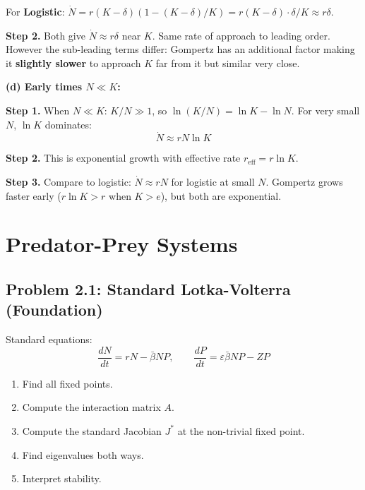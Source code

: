 \documentclass[10pt]{article}
\begin{document}
\begin{solution}
For \textbf{Logistic}: $\dot N = r(K-\delta)(1-(K-\delta)/K) = r(K-\delta)\cdot\delta/K \approx r\delta$.

\textbf{Step 2.} Both give $\dot N \approx r\delta$ near $K$. Same rate of approach to leading order. However the sub-leading terms differ: Gompertz has an additional factor making it \textbf{slightly slower} to approach $K$ far from it but similar very close.

\medskip\textbf{(d) Early times $N \ll K$:}

\textbf{Step 1.} When $N \ll K$: $K/N \gg 1$, so $\ln(K/N) = \ln K - \ln N$. For very small $N$, $\ln K$ dominates:
\[
\dot N \approx rN\ln K
\]

\textbf{Step 2.} This is exponential growth with effective rate $r_{\text{eff}} = r\ln K$.

\textbf{Step 3.} Compare to logistic: $\dot N \approx rN$ for logistic at small $N$. Gompertz grows faster early ($r\ln K > r$ when $K > e$), but both are exponential.
\end{solution}

\newpage
\section{Predator-Prey Systems}

\subsection{Problem 2.1: Standard Lotka-Volterra (Foundation)}

\begin{problem}
Standard equations:
\[
\frac{dN}{dt} = rN - \bar{\beta} NP, \qquad \frac{dP}{dt} = \varepsilon\bar{\beta}NP - ZP
\]

\begin{enumerate}[label=(\alph*)]
\item Find all fixed points.
\item Compute the interaction matrix $A$.
\item Compute the standard Jacobian $J^*$ at the non-trivial fixed point.
\item Find eigenvalues both ways.
\item Interpret stability.
\end{enumerate}
\end{problem}
\end{document}
